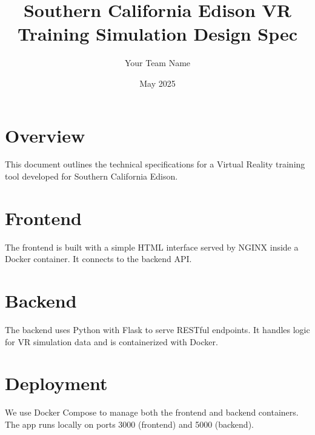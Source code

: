 \documentclass{article}
\title{Southern California Edison VR Training Simulation Design Spec}
\author{Your Team Name}
\date{May 2025}
\begin{document}
\maketitle

\section*{Overview}
This document outlines the technical specifications for a Virtual Reality training tool developed for Southern California Edison.

\section*{Frontend}
The frontend is built with a simple HTML interface served by NGINX inside a Docker container. It connects to the backend API.

\section*{Backend}
The backend uses Python with Flask to serve RESTful endpoints. It handles logic for VR simulation data and is containerized with Docker.

\section*{Deployment}
We use Docker Compose to manage both the frontend and backend containers. The app runs locally on ports 3000 (frontend) and 5000 (backend).
\end{document}
